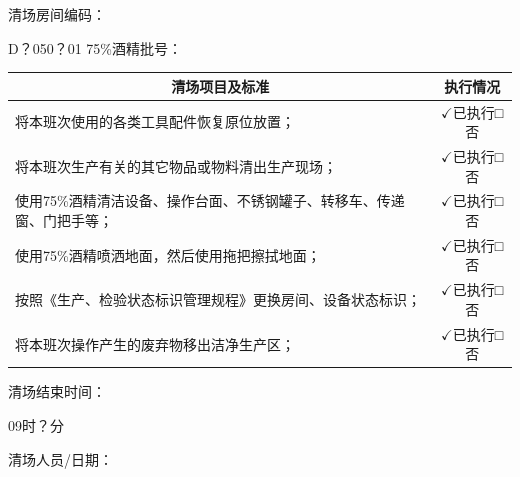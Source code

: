 \documentclass[UTF8,10pt,a4paper,fontset=fandol]{ctexart}
\newcommand{\fieldvalue}[1]{#1}
\newcommand{\handwritten}[1]{#1}
\let\mathcheckmark\checkmark
\renewcommand{\checkmark}{\ensuremath{\mathcheckmark}}
\begin{document}
\noindent
清场房间编码：

\fieldvalue{\handwritten{D？050？01}}
\hfill 75\%酒精批号：

\vspace{0.5em}

\begin{tabularx}{\textwidth}{|X|c|}
\hline
\multicolumn{1}{|c|}{清场项目及标准} & 执行情况 \\ \hline
将本班次使用的各类工具配件恢复原位放置；
&
\fieldvalue{\handwritten{\checkmark}}已执行\quad □否
\\ \hline
将本班次生产有关的其它物品或物料清出生产现场；
&
\fieldvalue{\handwritten{\checkmark}}已执行\quad □否
\\ \hline
使用75\%酒精清洁设备、操作台面、不锈钢罐子、转移车、传递窗、门把手等；
&
\fieldvalue{\handwritten{\checkmark}}已执行\quad □否
\\ \hline
使用75\%酒精喷洒地面，然后使用拖把擦拭地面；
&
\fieldvalue{\handwritten{\checkmark}}已执行\quad □否
\\ \hline
按照《生产、检验状态标识管理规程》更换房间、设备状态标识；
&
\fieldvalue{\handwritten{\checkmark}}已执行\quad □否
\\ \hline
将本班次操作产生的废弃物移出洁净生产区；
&
\fieldvalue{\handwritten{\checkmark}}已执行\quad □否
\\ \hline
\end{tabularx}

\noindent
清场结束时间：

\fieldvalue{\handwritten{09时？分}}

\noindent
清场人员/日期：
\end{document}
